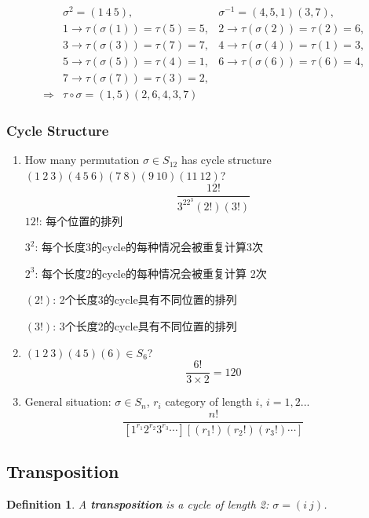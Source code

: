 \documentclass[11pt,a4paper]{article}
\newtheorem{definition}{Definition}
\begin{document}
\begin{equation}
    \begin{aligned}
        &\sigma^2=(1\ 4\ 5),&\sigma^{-1}=(4,5,1)(3,7),\\
        &1 \rightarrow	\tau(\sigma(1))=\tau(5)=5,
        &2 \rightarrow	\tau(\sigma(2))=\tau(2)=6,\\
        &3 \rightarrow	\tau(\sigma(3))=\tau(7)=7,
        &4 \rightarrow	\tau(\sigma(4))=\tau(1)=3,\\
        &5 \rightarrow	\tau(\sigma(5))=\tau(4)=1,
        &6 \rightarrow	\tau(\sigma(6))=\tau(6)=4,\\
        &7 \rightarrow	\tau(\sigma(7))=\tau(3)=2,\\
        \Rightarrow	& \tau\circ \sigma=(1,5)(2,6,4,3,7)
    \end{aligned}
    \nonumber
\end{equation}



\subsubsection{Cycle Structure}
\begin{enumerate}[$\bullet$]
    \item How many permutation $\sigma\in S_{12}$ has cycle structure $(1\ 2\ 3)(4\ 5\ 6)(7\ 8)(9\ 10)(11\ 12)$?
    $$\frac{12!}{3^22^3(2!)(3!)}$$
    $12!$: 每个位置的排列

    $3^2$: 每个长度3的cycle的每种情况会被重复计算3次

    $2^3$: 每个长度2的cycle的每种情况会被重复计算
    2次

    $(2!)$: 2个长度3的cycle具有不同位置的排列

    $(3!)$: 3个长度2的cycle具有不同位置的排列
    \item $(1\ 2\ 3)(4\ 5)(6)\in S_6$?
    $$\frac{6!}{3\times 2}=120$$
    \item General situation: $\sigma\in S_n$, $r_i$ category of length $i$, $i=1,2...$
    $$\frac{n!}{[1^{r_1}2^{r_2}3^{r_3}\cdots][(r_1!)(r_2!)(r_3!)\cdots]}$$
\end{enumerate}


\subsection{Transposition}
\begin{definition}
A \textbf{transposition} is a cycle of length 2: $\sigma=(i\ j)$.
\end{definition}
\end{document}
